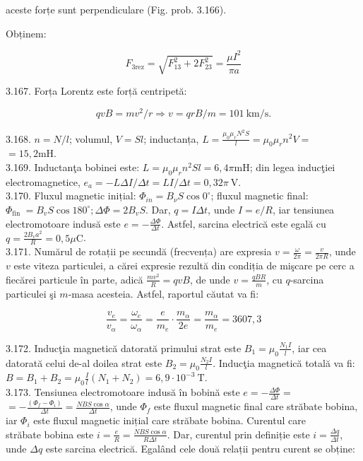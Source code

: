 aceste forțe sunt perpendiculare (Fig. prob. 3.166).

Obținem:

$$
F_{3 \mathrm{rez}}=\sqrt{F_{13}^{2}+2 F_{23}^{2}}=\frac{\mu I^{2}}{\pi a}
$$

3.167. Forța Lorentz este forță centripetă:

$$
q v B=m v^{2} / r \Rightarrow v=q r B / m=101 \mathrm{~km} / \mathrm{s} .
$$

3.168. $n=N / l$; volumul, $V=S l$; inductanța, $L=\frac{\mu_{0} \mu_{r} N^{2} S}{l}=\mu_{0} \mu_{r} n^{2} V=$ $=15,2 \mathrm{mH}$.\\
3.169. Inductanţa bobinei este: $L=\mu_{0} \mu_{r} n^{2} S l=6,4 \pi \mathrm{mH}$; din legea inducţiei electromagnetice, $e_{a}=-L \Delta I / \Delta t=L I / \Delta t=0,32 \pi \mathrm{~V}$.\\
3.170. Fluxul magnetic inițial: $\Phi_{i n}=B_{\nu} S \cos 0^{\circ}$; fluxul magnetic final: $\Phi_{\text {fin }}=B_{v} S \cos 180^{\circ} ; \Delta \Phi=2 B_{v} S$. Dar, $q=I \Delta t$, unde $I=e / R$, iar tensiunea electromotoare indusă este $e=-\frac{\Delta \Phi}{\Delta t}$. Astfel, sarcina electrică este egală cu $q=\frac{2 B_{v} a^{2}}{R}=0,5 \mu \mathrm{C}$.\\
3.171. Numărul de rotații pe secundă (frecvența) are expresia $v=\frac{\omega}{2 \pi}=\frac{v}{2 \pi R}$, unde $v$ este viteza particulei, a cărei expresie rezultă din condiția de mişcare pe cerc a fiecărei particule în parte, adică $\frac{m v^{2}}{R}=q v B$, de unde $v=\frac{q B R}{m}$, cu $q$-sarcina particulei şi $m$-masa acesteia. Astfel, raportul căutat va fi:

$$
\frac{v_{e}}{v_{\alpha}}=\frac{\omega_{e}}{\omega_{\alpha}}=\frac{e}{m_{e}} \cdot \frac{m_{\alpha}}{2 e}=\frac{m_{\alpha}}{m_{e}}=3607,3
$$

3.172. Inducţia magnetică datorată primului strat este $B_{1}=\mu_{0} \frac{N_{1} I}{l}$, iar cea datorată celui de-al doilea strat este $B_{2}=\mu_{0} \frac{N_{2} I}{l}$. Inducţia magnetică totală va fi: $B=B_{1}+B_{2}=\mu_{0} \frac{I}{l}\left(N_{1}+N_{2}\right)=6,9 \cdot 10^{-3} \mathrm{~T}$.\\
3.173. Tensiunea electromotoare indusă în bobină este $e=-\frac{\Delta \Phi}{\Delta t}=$ $=-\frac{\left(\Phi_{f}-\Phi_{i}\right)}{\Delta t}=\frac{N B S \cos \alpha}{\Delta t}$, unde $\Phi_{f}$ este fluxul magnetic final care străbate bobina, iar $\Phi_{i}$ este fluxul magnetic inițial care străbate bobina. Curentul care\\
străbate bobina este $i=\frac{e}{R}=\frac{N B S \cos \alpha}{R \Delta t}$. Dar, curentul prin definiție este $i=\frac{\Delta q}{\Delta t}$, unde $\Delta q$ este sarcina electrică. Egalând cele două relații pentru curent se obține:


